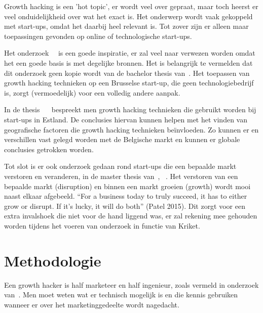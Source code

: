 Growth hacking is een 'hot topic', er wordt veel over gepraat, maar toch heerst er veel onduidelijkheid over wat het exact is. Het onderwerp wordt vaak gekoppeld met start-ups, omdat het daarbij heel relevant is. Tot zover zijn er alleen maar toepassingen gevonden op online of technologische start-ups.

Het onderzoek~~\autocite{Lee2016} is een goede inspiratie, er zal veel naar verwezen worden omdat het een goede basis is met degelijke bronnen. Het is belangrijk te vermelden dat dit onderzoek geen kopie wordt van de bachelor thesis van~\textcite{Lee2016}. Het toepassen van growth hacking technieken op een Brusselse start-up, die geen technologiebedrijf is, zorgt (vermoedelijk) voor een volledig andere aanpak. 

In de thesis ~~\autocite{Vunk2017} bespreekt men growth hacking technieken die gebruikt worden bij start-ups in Estland. De conclusies hiervan kunnen helpen met het vinden van geografische factoren die growth hacking technieken beïnvloeden. Zo kunnen er en verschillen vast gelegd worden met de Belgische markt en kunnen er globale conclusies getrokken worden.

Tot slot is er ook onderzoek gedaan rond start-ups die een bepaalde markt verstoren en veranderen, in de master thesis van~\textcite{Bergendal2017}, ~. Het verstoren van een bepaalde markt (disruption) en binnen een markt groeien (growth) wordt mooi naast elkaar afgebeeld. “For a business today to truly succeed, it has to either grow or disrupt. If it’s lucky, it will do both” (Patel 2015). Dit zorgt voor een extra invalshoek die niet voor de hand liggend was, er zal rekening mee gehouden worden tijdens het voeren van onderzoek in functie van Kriket. 


\section{Methodologie}
\label{sec:methodologie}

Een growth hacker is half marketeer en half ingenieur, zoals vermeld in onderzoek van~\textcite{Lee2016}. Men moet weten wat er technisch mogelijk is en die kennis gebruiken wanneer er over het marketinggedeelte wordt nagedacht. 

